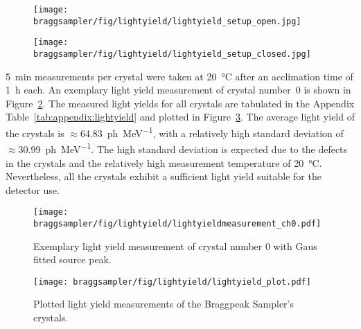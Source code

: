 \begin{figure}[h!]
    \centering
    \begin{minipage}[t]{.5\textwidth}
        \centering
        \captionsetup{width=.9\linewidth}
        \texttt{[image: braggsampler/fig/lightyield/lightyield\_setup\_open.jpg]}
        \label{fig:pwo:lightyield:open}
    \end{minipage}%
    \begin{minipage}[t]{.5\textwidth}
        \centering
        \captionsetup{width=.9\linewidth}
        \texttt{[image: braggsampler/fig/lightyield/lightyield\_setup\_closed.jpg]}
        \label{fig:pwo:lightyield:closed}
    \end{minipage}
\end{figure}

\SI{5}{\minute} measurements per crystal were taken at \SI{20}{\celsius} after an acclimation time of \SI{1}{\hour} each.
An exemplary light yield measurement of crystal number~0 is shown in Figure~\ref{fig:pwo:lightyield:measurement}.
The measured light yields for all crystals are tabulated in the Appendix Table~\ref{tab:appendix:lightyield} and plotted in Figure~\ref{fig:pwo:lightyield:plot}.
The average light yield of the  crystals is $\approx$\SI{64.83}{ph\per\mega\electronvolt}, with a relatively high standard deviation of $\approx$\SI{30.99}{ph\per\mega\electronvolt}.
The high standard deviation is expected due to the defects in the crystals and the relatively high measurement temperature of \SI{20}{\celsius}.
Nevertheless, all the crystals exhibit a sufficient light yield suitable for the detector use.

\begin{figure}[h!]
    \centering
    \texttt{[image: braggsampler/fig/lightyield/lightyieldmeasurement\_ch0.pdf]}
    \caption{Exemplary light yield measurement of crystal number 0 with Gaus fitted  source peak.}\label{fig:pwo:lightyield:measurement}
\end{figure}

\begin{figure}
    \centering
    \texttt{[image: braggsampler/fig/lightyield/lightyield\_plot.pdf]}
    \caption{Plotted light yield measurements of the Braggpeak Sampler's crystals.}\label{fig:pwo:lightyield:plot}
\end{figure}